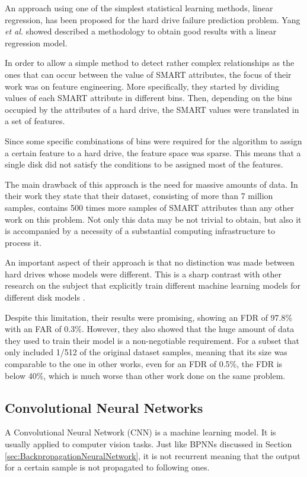 An approach using one of the simplest statistical learning methods, linear regression, has been proposed for the hard drive failure prediction problem.
Yang \textit{et al.} \cite{yang2015hard} showed described a methodology to obtain good results with a linear regression model.

In order to allow a simple method to detect rather complex relationships as the ones that can occur between the value of SMART attributes, the focus of their work was on feature engineering.
More specifically, they started by dividing values of each SMART attribute in different bins.
Then, depending on the bins occupied by the attributes of a hard drive, the SMART values were translated in a set of features.

Since some specific combinations of bins were required for the algorithm to assign a certain feature to a hard drive, the feature space was sparse.
This means that a single disk did not satisfy the conditions to be assigned most of the features.

The main drawback of this approach is the need for massive amounts of data.
In their work they state that their dataset, consisting of more than 7 million samples, contains 500 times more samples of SMART attributes than any other work on this problem.
Not only this data may be not trivial to obtain, but also it is accompanied by a necessity of a substantial computing infrastructure to process it.

An important aspect of their approach is that no distinction was made between hard drives whose models were different.
This is a sharp contrast with other research on the subject that explicitly train different machine learning models for different disk models \cite{Xu16} \cite{Shen18} \cite{Li14}. 

Despite this limitation, their results were promising, showing an FDR of 97.8\% with an FAR of 0.3\%.
However, they also showed that the huge amount of data they used to train their model is a non-negotiable requirement.
For a subset that only included 1/512 of the original dataset samples, meaning that its size was comparable to the one in other works, even for an FDR of 0.5\%, the FDR is below 40\%, which is much worse than other work done on the same problem.

\subsection{Convolutional Neural Networks}

A Convolutional Neural Network (CNN) is a machine learning model.
It is usually applied to computer vision tasks.
Just like BPNNs discussed in Section \ref{sec:BackpropagationNeuralNetwork}, it is not recurrent meaning that the output for a certain sample is not propagated to following ones.

